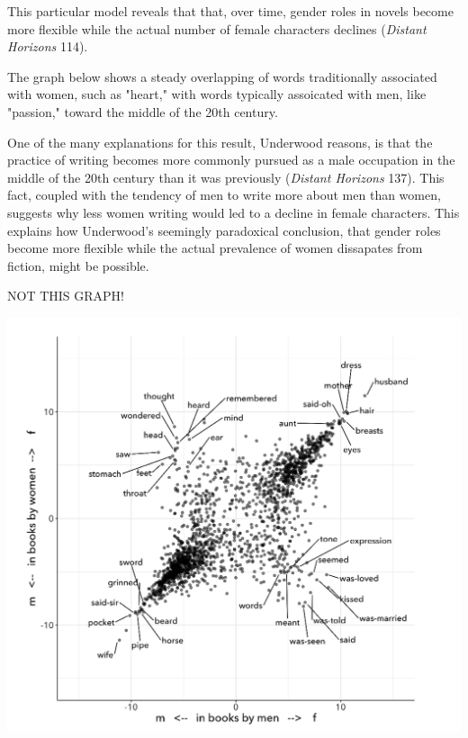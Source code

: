 \documentclass[11pt]{article}
\begin{document}
This particular model reveals that that, over time, gender roles in
novels become more flexible while the actual number of female
characters declines (\emph{Distant Horizons} 114). 

The graph below shows a steady overlapping of words traditionally
associated with women, such as "heart," with words typically
assoicated with men, like "passion," toward the middle of the 20th
century. 

One of the many explanations for this result, Underwood reasons, is
that the practice of writing becomes more commonly pursued as a male
occupation in the middle of the 20th century than it was previously
(\emph{Distant Horizons} 137). This fact, coupled with the tendency of men
to write more about men than women, suggests why less women writing
would led to a decline in female characters. This explains how
Underwood's seemingly paradoxical conclusion, that gender roles become
more flexible while the actual prevalence of women dissapates from
fiction, might be possible.

NOT THIS GRAPH!
\begin{center}
\includegraphics[width=.9\linewidth]{./img/Underwood.png}
\end{center}
\end{document}
